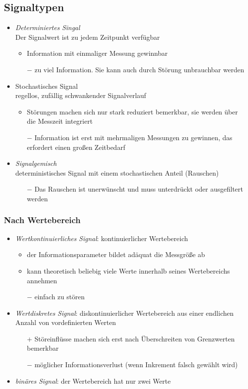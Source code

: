 \documentclass{scrreprt}
\begin{document}
\subsection{Signaltypen}
\begin{itemize}
\item \emph{Determiniertes Singal}\\
Der Signalwert ist zu jedem Zeitpunkt verfügbar
\begin{itemize}[label=$+$]
\item Information mit einmaliger Messung gewinnbar
\item[$-$] zu viel Information. Sie kann auch durch Störung unbrauchbar werden
\end{itemize}
\item Stochastisches Signal\\
regellos, zufällig schwankender Signalverlauf
\begin{itemize}[label=$+$]
\item Störungen machen sich nur stark reduziert bemerkbar, sie werden über die Messzeit integriert
\item[$-$] Information ist erst mit mehrmaligen Messungen zu gewinnen, das erfordert einen großen Zeitbedarf
\end{itemize}
\item \emph{Signalgemisch}\\
deterministisches Signal mit einem stochastischen Anteil (Rauschen)
\begin{itemize}
\item[$-$] Das Rauschen ist unerwünscht und muss unterdrückt oder ausgefiltert werden
\end{itemize}
\end{itemize}

\subsubsection{Nach Wertebereich}
\begin{itemize}
\item \emph{Wertkontinuierliches Signal}: kontinuierlicher Wertebereich
\begin{itemize}[label=$+$]
\item der Informationsparameter bildet adäquat die Messgröße ab
\item kann theoretisch beliebig viele Werte innerhalb seines Wertebereichs annehmen
\item[$-$] einfach zu stören
\end{itemize}
\item \emph{Wertdiskretes Signal}: diskontinuierlicher Wertebereich aus einer endlichen Anzahl von vordefinierten Werten
\begin{itemize}
\item[$+$] Störeinflüsse machen sich erst nach Überschreiten von Grenzwerten bemerkbar
\item[$-$] möglicher Informationsverlust (wenn Inkrement falsch gewählt wird)
\end{itemize}
\item \emph{binäres Signal}: der Wertebereich hat nur zwei Werte
\end{itemize}
\end{document}
